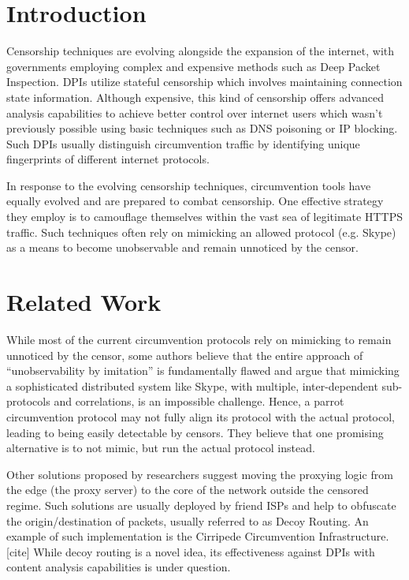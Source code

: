 \section{Introduction}
Censorship techniques are evolving alongside the expansion of the internet, with governments employing complex and expensive methods such as Deep Packet Inspection. DPIs utilize stateful censorship which involves maintaining connection state information. Although expensive, this kind of censorship offers advanced analysis capabilities to achieve better control over internet users which wasn't previously possible using basic techniques such as DNS poisoning or IP blocking. Such DPIs usually distinguish circumvention traffic by identifying unique fingerprints of different internet protocols.

In response to the evolving censorship techniques, circumvention tools have equally evolved and are prepared to combat censorship. One effective strategy they employ is to camouflage themselves within the vast sea of legitimate HTTPS traffic. Such techniques often rely on mimicking an allowed protocol (e.g. Skype) as a means to become unobservable and remain unnoticed by the censor.

\section{Related Work}
While most of the current circumvention protocols rely on mimicking to remain unnoticed by the censor, some authors believe that the entire approach of “unobservability by imitation” is fundamentally flawed and argue that mimicking a sophisticated distributed system like Skype, with multiple, inter-dependent sub-protocols and correlations, is an impossible challenge. Hence, a parrot circumvention protocol may not fully align its protocol with the actual protocol, leading to being easily detectable by censors. They believe that one promising alternative is to not mimic, but run the actual protocol instead.\cite{houmansadr2013parrot}

Other solutions proposed by researchers suggest moving the proxying logic from the edge (the proxy server) to the core of the network outside the censored regime. Such solutions are usually deployed by friend ISPs and help to obfuscate the origin/destination of packets, usually referred to as Decoy Routing. An example of such implementation is the Cirripede Circumvention Infrastructure.[cite] While decoy routing is a novel idea, its effectiveness against DPIs with content analysis capabilities is under question.\cite{karlin2011decoy}\cite{houmansadr2011cirripede}

